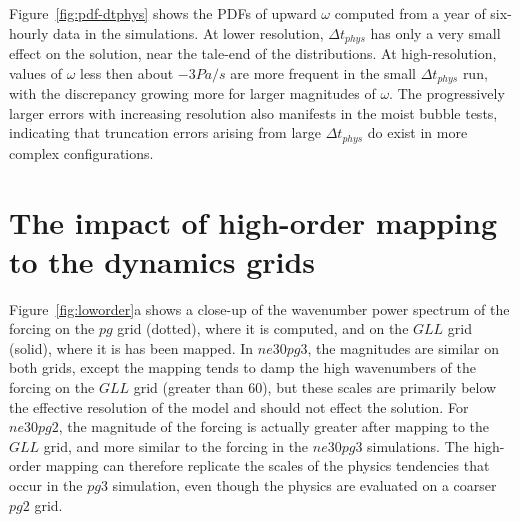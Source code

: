 \documentclass{agujournal}
\begin{document}
Figure~\ref{fig:pdf-dtphys} shows the PDFs of upward $\omega$ computed from a year of six-hourly data in the simulations. At lower resolution, $\Delta t_{phys}$ has only a very small effect on the solution, near the tale-end of the distributions. At high-resolution, values of $\omega$ less then about $-3 Pa/s$ are more frequent in the small $\Delta t_{phys}$ run, with the discrepancy growing more for larger magnitudes of $\omega$. The progressively larger errors with increasing resolution also manifests in the moist bubble tests, indicating that truncation errors arising from large $\Delta t_{phys}$ do exist in more complex configurations.

\section{The impact of high-order mapping to the dynamics grids}\label{sec:app2}

Figure~\ref{fig:loworder}a shows a close-up of the wavenumber power spectrum of the forcing on the $pg$ grid (dotted), where it is computed, and on the $GLL$ grid (solid), where it is has been mapped. In $ne30pg3$, the magnitudes are similar on both grids, except the mapping tends to damp the high wavenumbers of the forcing on the $GLL$ grid (greater than 60), but these scales are primarily below the effective resolution of the model and should not effect the solution. For $ne30pg2$, the magnitude of the forcing is actually greater after mapping to the $GLL$ grid, and more similar to the forcing in the $ne30pg3$ simulations. The high-order mapping can therefore replicate the scales of the physics tendencies that occur in the $pg3$ simulation, even though the physics are evaluated on a coarser $pg2$ grid.
\end{document}
